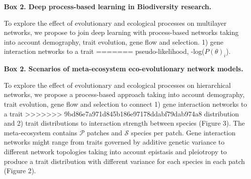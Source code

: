 \documentclass[12pt]{article}
\begin{document}
\begin{center}

\begin{mybox}\begin{singlespace}
{\bf{Box 2. Deep process-based learning in Biodiversity research.}}\\
\begin{small} To explore the effect of evolutionary and ecological processes on multilayer networks, we propose to join deep learning with process-based networks taking into account demography, trait evolution, gene flow and selection.  1) gene interaction networks to a trait
=======
pseudo-likelihood, -log($P(\theta)_{i}$).
 \end{small}
\end{singlespace}
\end{mybox}


\begin{mybox}\begin{singlespace}
{\bf{Box 2. Scenarios of meta-ecosystem eco-evolutionary network models.}}\\
\begin{small} To explore the effect of evolutionary and ecological
  processes on hierarchical networks, we propose a process-based
  approach taking into account demography, trait evolution, gene flow
  and selection to connect 1) gene interaction networks to a trait
>>>>>>> 9bd86e7a971d845b186e97178ddabf79dab974a8
  distribution and 2) trait distributions to interaction strength
  between species (Figure 3). The meta-ecosystem contains
  $\mathcal{P}$ patches and $\mathcal{S}$ species per patch. Gene
  interaction networks might range from traits governed by additive
  genetic variance to different network topologies taking into account
  epistasis and pleiotropy to produce a trait distribution with
  different variance for each species in each patch (Figure
  2)\citep{Stearns:2010,EyreWalker:2010,Wagner&Zhang:2011,Solovieffetal:2013,North&Beaumont:2015,Melo&Marroig:2015,Pavlicevetal:2015}.


\end{small}
\end{singlespace}
\end{mybox}
\end{center}
\end{document}
